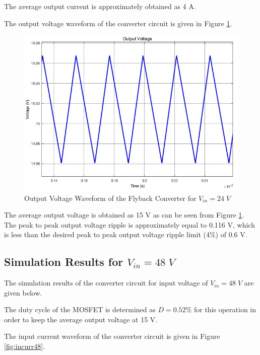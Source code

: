 The average output current is approximately obtained as 4 A.

The output voltage waveform of the converter circuit is given in Figure \ref{fig:outvolt24}.

\begin{figure}[H]
\begin{center}
\includegraphics[width=1\textwidth]{output_voltage_24.jpg}
\caption{Output Voltage Waveform of the Flyback Converter for $ V_{in} = 24\;V $}
\label{fig:outvolt24}
\end{center}
\end{figure}

The average output voltage is obtained as 15 V as can be seen from Figure \ref{fig:outvolt24}. The peak to peak output voltage ripple is approximately equal to 0.116 V, which is less than the desired peak to peak output voltage ripple limit (4\%) of 0.6 V.

\subsection{Simulation Results for $ V_{in} = 48\;V $}

The simulation results of the converter circuit for input voltage of $ V_{in} = 48\;V $ are given below.

The duty cycle of the MOSFET is determined as $ D = 0.52\% $ for this operation in order to keep the average output voltage at 15 V.

The input current waveform of the converter circuit is given in Figure \ref{fig:incurr48}.

